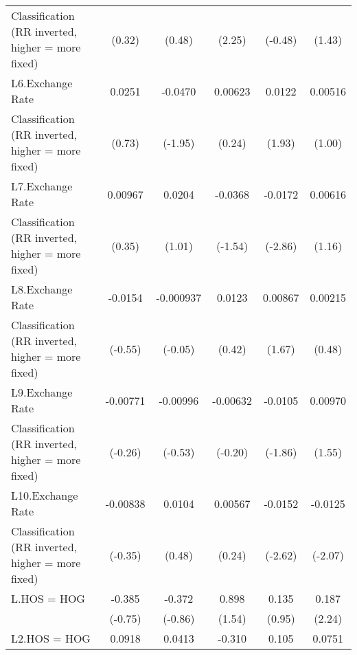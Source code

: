 {\begin{tabular}{l*{5}{c}}
Classification (RR inverted, higher = more fixed)&      (0.32)         &      (0.48)         &      (2.25)         &     (-0.48)         &      (1.43)         \\
[1em]
L6.Exchange Rate    &      0.0251         &     -0.0470         &     0.00623         &      0.0122         &     0.00516         \\
Classification (RR inverted, higher = more fixed)&      (0.73)         &     (-1.95)         &      (0.24)         &      (1.93)         &      (1.00)         \\
[1em]
L7.Exchange Rate    &     0.00967         &      0.0204         &     -0.0368         &     -0.0172\sym{**} &     0.00616         \\
Classification (RR inverted, higher = more fixed)&      (0.35)         &      (1.01)         &     (-1.54)         &     (-2.86)         &      (1.16)         \\
[1em]
L8.Exchange Rate    &     -0.0154         &   -0.000937         &      0.0123         &     0.00867         &     0.00215         \\
Classification (RR inverted, higher = more fixed)&     (-0.55)         &     (-0.05)         &      (0.42)         &      (1.67)         &      (0.48)         \\
[1em]
L9.Exchange Rate    &    -0.00771         &    -0.00996         &    -0.00632         &     -0.0105         &     0.00970         \\
Classification (RR inverted, higher = more fixed)&     (-0.26)         &     (-0.53)         &     (-0.20)         &     (-1.86)         &      (1.55)         \\
[1em]
L10.Exchange Rate   &    -0.00838         &      0.0104         &     0.00567         &     -0.0152\sym{**} &     -0.0125\sym{*}  \\
Classification (RR inverted, higher = more fixed)&     (-0.35)         &      (0.48)         &      (0.24)         &     (-2.62)         &     (-2.07)         \\
[1em]
L.HOS = HOG         &      -0.385         &      -0.372         &       0.898         &       0.135         &       0.187\sym{*}  \\
                    &     (-0.75)         &     (-0.86)         &      (1.54)         &      (0.95)         &      (2.24)         \\
[1em]
L2.HOS = HOG        &      0.0918         &      0.0413         &      -0.310         &       0.105         &      0.0751         \\

\end{tabular}}
